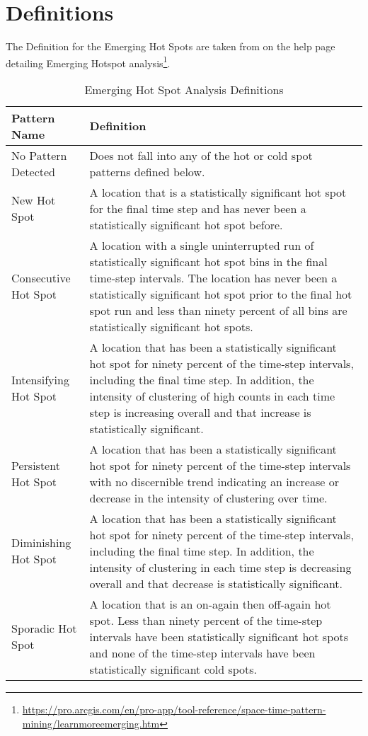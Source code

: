 \chapter{Definitions}
\label{Definition_appendix}

The Definition for the Emerging Hot Spots are taken from \cite{Esri} on the help page detailing Emerging Hotspot analysis\footnote{\url{https://pro.arcgis.com/en/pro-app/tool-reference/space-time-pattern-mining/learnmoreemerging.htm}}. 

\begin{longtable}{|l|p{10cm}|}
\caption{Emerging Hot Spot Analysis} 
\label{App:EmergingHotspotdef}
\endfirsthead
\caption{Emerging Hot Spot Analysis Definitions} 
\endhead
\hline
Pattern Name & Definition \\ \hline
No Pattern Detected & Does not fall into any of the hot or cold spot patterns defined below. \\ \hline
New Hot Spot & A location that is a statistically significant hot spot for the final time step and has never been a statistically significant hot spot before. \\ \hline
Consecutive Hot Spot & A location with a single uninterrupted run of statistically significant hot spot bins in the final time-step intervals. The location has never been a statistically significant hot spot prior to the final hot spot run and less than ninety percent of all bins are statistically significant hot spots. \\ \hline
Intensifying Hot Spot & A location that has been a statistically significant hot spot for ninety percent of the time-step intervals, including the final time step. In addition, the intensity of clustering of high counts in each time step is increasing overall and that increase is statistically significant. \\ \hline
Persistent Hot Spot & A location that has been a statistically significant hot spot for ninety percent of the time-step intervals with no discernible trend indicating an increase or decrease in the intensity of clustering over time. \\ \hline
Diminishing Hot Spot & A location that has been a statistically significant hot spot for ninety percent of the time-step intervals, including the final time step. In addition, the intensity of clustering in each time step is decreasing overall and that decrease is statistically significant. \\ \hline
Sporadic Hot Spot & A location that is an on-again then off-again hot spot. Less than ninety percent of the time-step intervals have been statistically significant hot spots and none of the time-step intervals have been statistically significant cold spots. \\ \hline

\end{longtable}

